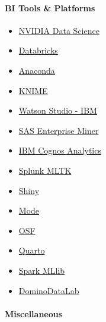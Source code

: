 \documentclass[
]{article}
\providecommand{\tightlist}{%
  \setlength{\itemsep}{0pt}\setlength{\parskip}{0pt}}
\begin{document}
\hypertarget{bi-tools-platforms}{%
\paragraph{BI Tools \& Platforms}\label{bi-tools-platforms}}

\begin{itemize}
\tightlist
\item
  \href{https://www.nvidia.com/en-us/deep-learning-ai/software/rapids/}{NVIDIA
  Data Science}
\item
  \href{https://www.databricks.com}{Databricks}
\item
  \href{https://www.anaconda.com/why-anaconda}{Anaconda}
\item
  \href{https://www.knime.com/knime-analytics-platform}{KNIME}
\item
  \href{https://www.ibm.com/cloud/watson-studio}{Watson Studio - IBM}
\item
  \href{https://www.sas.com/en_us/software/enterprise-miner.html}{SAS
  Enterprise Miner}
\item
  \href{https://www.ibm.com/products/cognos-analytics}{IBM Cognos
  Analytics}
\item
  \href{https://splunkbase.splunk.com/app/2890}{Splunk MLTK}
\item
  \href{https://shiny.posit.co/?_gl=1*ndp1ah*_ga*MTMyMDE5NzEyMi4xNjg1MDMwNzUx*_ga_2C0WZ1JHG0*MTY4NTE1Njk4My40LjEuMTY4NTE1NzMxNi4wLjAuMA..}{Shiny}
\item
  \href{https://mode.com/platform/}{Mode}
\item
  \href{https://osf.io}{OSF}
\item
  \href{https://quarto.org}{Quarto}
\item
  \href{https://spark.apache.org}{Spark MLlib}
\item
  \href{https://www.dominodatalab.com/solutions/data-scientists/}{DominoDataLab}
\end{itemize}

\hypertarget{miscellaneous}{%
\paragraph{Miscellaneous}\label{miscellaneous}}
\end{document}
